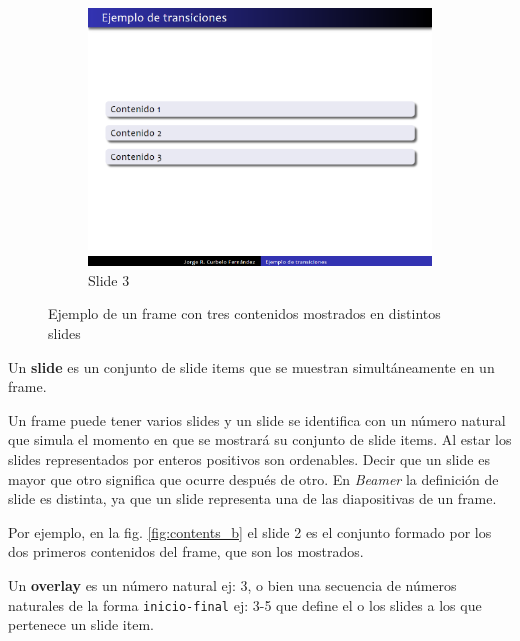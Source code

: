 \begin{figure}[tb]
\begin{subfigure}[b]{0.3\textwidth}
 				\includegraphics[width=\textwidth]{img/content3}
 				\caption{Slide 3}
 				\label{fig:contents_c}	
 			\end{subfigure}	 			
 			\caption{Ejemplo de un frame con tres contenidos mostrados en distintos slides}
 			\label{fig:contents} 
 		\end{figure}

 		\begin{definition}
 		\label{def:slide}
 			Un \textbf{slide} es un conjunto de slide items que se muestran simultáneamente en un frame.
 		\end{definition}
		
		Un frame puede tener varios slides y un slide se identifica con un número natural que simula el momento en que se mostrará su conjunto de slide items. Al estar los slides representados por enteros positivos son ordenables. Decir que un slide es mayor que otro significa que ocurre después de otro. En \textit{Beamer} la definición de slide es distinta, ya que un slide representa una de las diapositivas de un frame.

		Por ejemplo, en la fig. \ref{fig:contents_b} el slide 2 es el conjunto formado por los dos primeros contenidos del frame, que son los mostrados. 				

 		\begin{definition}
 		\label{def:overlay}
 			Un \textbf{overlay} es un número natural ej: 3, o bien una secuencia de números naturales de la forma \texttt{inicio-final} ej: 3-5 que define el o los slides a los que pertenece un slide item.
 		\end{definition}

